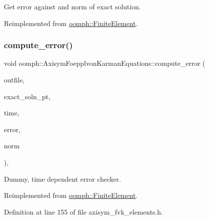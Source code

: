 Get error against and norm of exact solution. 



Reimplemented from \hyperlink{classoomph_1_1FiniteElement_a73c79a1f1e5b1d334757812a6bbd58ff}{oomph\+::\+Finite\+Element}.

\mbox{\label{classoomph_1_1AxisymFoepplvonKarmanEquations_a239536a30ed45a68f678037b9bdc7c9b}} 
\subsubsection{\texorpdfstring{compute\+\_\+error()}{compute\_error()}\hspace{0.1cm}{\footnotesize\ttfamily [2/4]}}
{\footnotesize\ttfamily void oomph\+::\+Axisym\+Foepplvon\+Karman\+Equations\+::compute\+\_\+error (\begin{DoxyParamCaption}\item[{std\+::ostream \&}]{outfile,  }\item[{\hyperlink{classoomph_1_1FiniteElement_ad4ecf2b61b158a4b4d351a60d23c633e}{Finite\+Element\+::\+Unsteady\+Exact\+Solution\+Fct\+Pt}}]{exact\+\_\+soln\+\_\+pt,  }\item[{const double \&}]{time,  }\item[{double \&}]{error,  }\item[{double \&}]{norm }\end{DoxyParamCaption})\hspace{0.3cm}{\ttfamily [inline]}, {\ttfamily [virtual]}}



Dummy, time dependent error checker. 



Reimplemented from \hyperlink{classoomph_1_1FiniteElement_a7f67853506dc73fa6b7505108de22d1f}{oomph\+::\+Finite\+Element}.



Definition at line 155 of file axisym\+\_\+fvk\+\_\+elements.\+h.

\mbox{\label{classoomph_1_1AxisymFoepplvonKarmanEquations_abbcf5312db19fdbe66f5dab3bbe9bfda}} 
